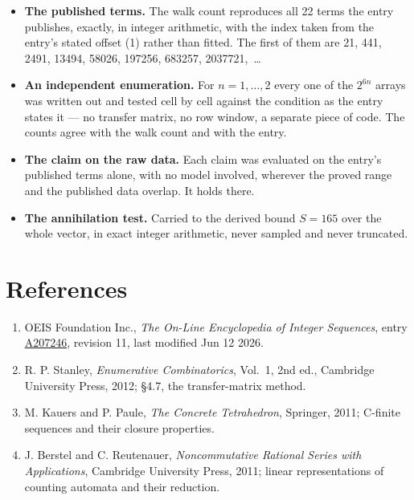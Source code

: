 \documentclass[11pt]{article}
\theoremstyle{definition}
\begin{document}
\begin{itemize}

\item {\bfseries The published terms.} The walk count reproduces all 22 terms the entry publishes, exactly, in integer arithmetic, with the index taken from the entry's stated offset (1) rather than fitted. The first of them are 21, 441, 2491, 13494, 58026, 197256, 683257, 2037721,~\dots

\item {\bfseries An independent enumeration.} For $n = 1,\dots,2$ every one of the $2^{6n}$ arrays was written out and tested cell by cell against the condition as the entry states it --- no transfer matrix, no row window, a separate piece of code. The counts agree with the walk count and with the entry.

\item {\bfseries The claim on the raw data.} Each claim was evaluated on the entry's published terms alone, with no model involved, wherever the proved range and the published data overlap. It holds there.

\item {\bfseries The annihilation test.} Carried to the derived bound $S = 165$ over the whole vector, in exact integer arithmetic, never sampled and never truncated.

\end{itemize}

\section{References}

\begin{enumerate}

\item OEIS Foundation Inc., \emph{The On-Line Encyclopedia of Integer Sequences}, entry \href{https://oeis.org/A207246}{A207246}, revision 11, last modified Jun 12 2026.

\item R. P. Stanley, \emph{Enumerative Combinatorics}, Vol.~1, 2nd ed., Cambridge University Press, 2012; \S4.7, the transfer-matrix method.

\item M. Kauers and P. Paule, \emph{The Concrete Tetrahedron}, Springer, 2011; C-finite sequences and their closure properties.

\item J. Berstel and C. Reutenauer, \emph{Noncommutative Rational Series with Applications}, Cambridge University Press, 2011; linear representations of counting automata and their reduction.

\end{enumerate}
\end{document}
